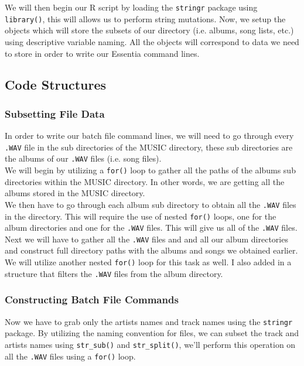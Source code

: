 \documentclass{article}\usepackage[]{graphicx}\usepackage[]{xcolor}
\begin{document}
\begin{multicols}{2}
We will then begin our R script by loading the \texttt{stringr} package using \texttt{library()}, this
will allows us to perform string mutations. Now, we setup the objects which will store the subsets of our
directory (i.e. albums, song lists, etc.) using descriptive variable naming. All the objects will correspond
to data we need to store in order to write our Essentia command lines.

\subsection{Code Structures}

\subsubsection{Subsetting File Data}
In order to write our batch file command lines, we will need to go through every \texttt{.WAV} file
in the sub directories of the MUSIC directory, these sub directories are the albums of our
\texttt{.WAV} files (i.e. song files). \\

We will begin by utilizing a \texttt{for()} loop to gather all the paths of the albums sub directories within the MUSIC directory. In other words, we are getting all the albums stored in the MUSIC directory. \\

We then have to go through each album sub directory to obtain all the \texttt{.WAV} files in the directory.
This will require the use of nested \texttt{for()} loops, one for the album directories and one for the
\texttt{.WAV} files. This will give us all of the \texttt{.WAV} files. \\

Next we will have to gather all the \texttt{.WAV} files and and all our album directories and construct full 
directory paths with the albums and songs we obtained earlier. We will utilize another nested \texttt{for()} 
loop for this task as well. I also added in a structure that filters the \texttt{.WAV} files from the album
directory.

\subsubsection{Constructing Batch File Commands}
Now we have to grab only the artists names and track names using the \texttt{stringr} package. By utilizing
the naming convention for files, we can subset the track and artists names using \texttt{str}\verb|_|\texttt{sub()}
and \texttt{str}\verb|_|\texttt{split()}, we'll perform this operation on all the \texttt{.WAV} files using a \texttt{for()} loop. \\


\end{multicols}
\end{document}
